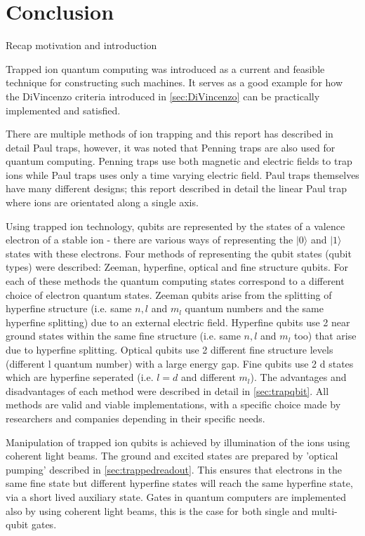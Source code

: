 \section{Conclusion}

Recap motivation and introduction



Trapped ion quantum computing was introduced as a current and feasible technique for constructing such machines. It serves as a good example for how the DiVincenzo criteria introduced in \cref{sec:DiVincenzo} can be practically implemented and satisfied.

There are multiple methods of ion trapping and this report has described in detail Paul traps, however, it was noted that Penning traps are also used for quantum computing.
Penning traps use both magnetic and electric fields to trap ions while Paul traps uses only a time varying electric field. Paul traps themselves have many different designs; this report described in detail the linear Paul trap where ions are orientated along a single axis.

Using trapped ion technology, qubits are represented by the states of a valence electron of a stable ion - there are various ways of representing the $|0\rangle$ and $|1\rangle$ states with these electrons.
Four methods of representing the qubit states (qubit types) were described: Zeeman, hyperfine, optical and fine structure qubits. 
For each of these methods the quantum computing states correspond to a different choice of electron quantum states.
Zeeman qubits arise from the splitting of hyperfine structure (i.e. same $n, l$ and $m_l$ quantum numbers and the same hyperfine splitting) due to an external electric field. 
Hyperfine qubits use 2 near ground states within the same fine structure (i.e. same $n, l$ and $m_l$ too) that arise due to hyperfine splitting.
Optical qubits use 2 different fine structure levels (different l quantum number) with a large energy gap.
Fine qubits use 2 d states which are hyperfine seperated (i.e. $l=d$ and different $m_l$).
The advantages and disadvantages of each method were described in detail in \cref{sec:trapqbit}. All methods are valid and viable implementations, with a specific choice made by researchers and companies depending in their specific needs. 

Manipulation of trapped ion qubits is achieved by illumination of the ions using coherent light beams.
The ground and excited states are prepared by 'optical pumping' described in \cref{sec:trappedreadout}.
This ensures that electrons in the same fine state but different hyperfine states will reach the same hyperfine state, via a short lived auxiliary state.
Gates in quantum computers are implemented also by using coherent light beams, this is the case for both single and multi-qubit gates.

